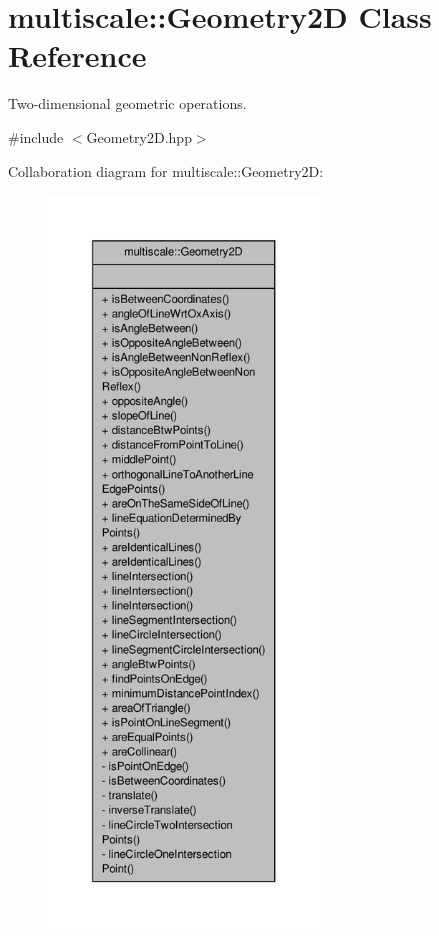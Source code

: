 \hypertarget{classmultiscale_1_1Geometry2D}{\section{multiscale\-:\-:Geometry2\-D Class Reference}
\label{classmultiscale_1_1Geometry2D}
}


Two-\/dimensional geometric operations.  




{\ttfamily \#include $<$Geometry2\-D.\-hpp$>$}



Collaboration diagram for multiscale\-:\-:Geometry2\-D\-:\nopagebreak
\begin{figure}[H]
\begin{center}
\leavevmode
\includegraphics[height=550pt]{classmultiscale_1_1Geometry2D__coll__graph}
\end{center}
\end{figure}

